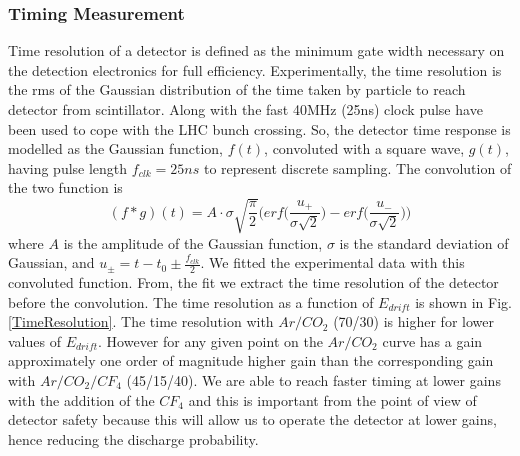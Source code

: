 \subsubsection{Timing Measurement}
Time resolution of a detector is defined as the minimum gate width necessary on the detection electronics for full efficiency. Experimentally, the time resolution is the rms of the Gaussian distribution of the time taken by particle to reach detector from scintillator. Along with the fast 40MHz (25ns) clock pulse have been used to cope with the LHC bunch crossing. So, the detector time response is modelled as the Gaussian function, $f(t)$, convoluted with a square wave, $g(t)$, having pulse length $f_{clk}=25ns$ to represent discrete sampling. 
The convolution of the two function is
\begin{equation}
(f*g)(t) = A \cdot \sigma \sqrt{\frac{\pi}{2}}\Big(erf\Big(\frac{u_{+}}{\sigma\sqrt{2}}\Big)-erf\Big(\frac{u_{-}}{\sigma\sqrt{2}}\Big)\Big)
\end{equation}
where $A$ is the amplitude of the Gaussian function, $\sigma$ is the standard deviation of Gaussian, and $u_{\pm}= t-t_0\pm\frac{f_{clk}}{2}$. 
We fitted the experimental data with this convoluted function. From, the fit we extract the time resolution of the detector before the convolution. The time resolution as a function of $E_{drift}$ is shown in Fig. \ref{TimeResolution}. The time resolution with $Ar/CO_2$ (70/30) is higher for lower values of $E_{drift}$. However for any given point on the $Ar/CO_2$ curve has a gain approximately one order of magnitude higher gain than the corresponding gain with $Ar/CO_2/CF_4$ (45/15/40).  We are able to reach faster timing at lower gains with the addition of the $CF_4$ and this is important from the point of view of detector safety because this will allow us to operate the detector at lower gains, hence reducing the discharge probability.

